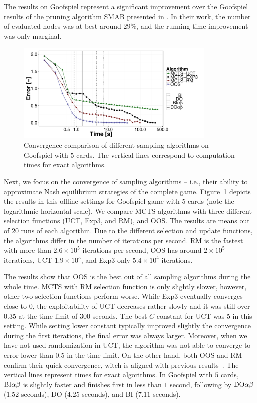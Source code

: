 The results on Goofspiel represent a significant improvement over the Goofspiel results of the pruning algorithm 
SMAB presented in \cite{Saffidine12SMAB}. In their work, the number of evaluated nodes was at best around $29\%$, 
and the running time improvement was only marginal. 

\begin{figure}
\centering
\includegraphics[width=0.85\textwidth]{figures/convergence-gs.pdf}
\caption{Convergence comparison of different sampling algorithms on Goofspiel with $5$ cards. The vertical lines correspond to computation times for exact algorithms.} \label{fig:off:conv:gs}
\end{figure}

Next, we focus on the convergence of sampling algorithms -- i.e., their ability to approximate Nash equilibrium strategies of the complete game. 
Figure~\ref{fig:off:conv:gs} depicts the results in this offline settings for Goofspiel game with $5$ cards (note the logarithmic horizontal scale).
We compare MCTS algorithms with three different selection functions (UCT, Exp3, and RM), and OOS.
The results are means out of $20$ runs of each algorithm.
Due to the different selection and update functions, the algorithms differ in the number of iterations per second.
RM is the fastest with more than $2.6\times 10^5$ iterations per second, OOS has around $2\times10^5$ iterations, UCT $1.9\times10^5$, and Exp3 only $5.4\times10^4$ iterations.

The results show that OOS is the best out of all sampling algorithms during the whole time. 
MCTS with RM selection function is only slightly slower, however, other two selection functions perform worse. 
While Exp3 eventually converges close to $0$, the exploitability of UCT decreases rather slowly and it was still over $0.35$ at the time limit of $300$ seconds. 
The best $C$ constant for UCT was 5 in this setting. While setting lower constant typically improved slightly the 
convergence during the first iterations, the final error was always larger.
Moreover, when we have not used randomization in UCT, the algorithm was not able to converge to error lower than $0.5$ in the time limit. 
On the other hand, both OOS and RM confirm their quick convergence, witch is aligned with previous results~\cite{Lanctot13Goofspiel}.
The vertical lines represent times for exact algorithms.
In Goofspiel with $5$ cards, $\textrm{BI}\alpha\beta$ is slightly faster and finishes first in less than $1$ second, following by $\textrm{DO}\alpha\beta$ ($1.52$ seconds), \textsc{DO} ($4.25$ seconds), and \textsc{BI} ($7.11$ seconds).


